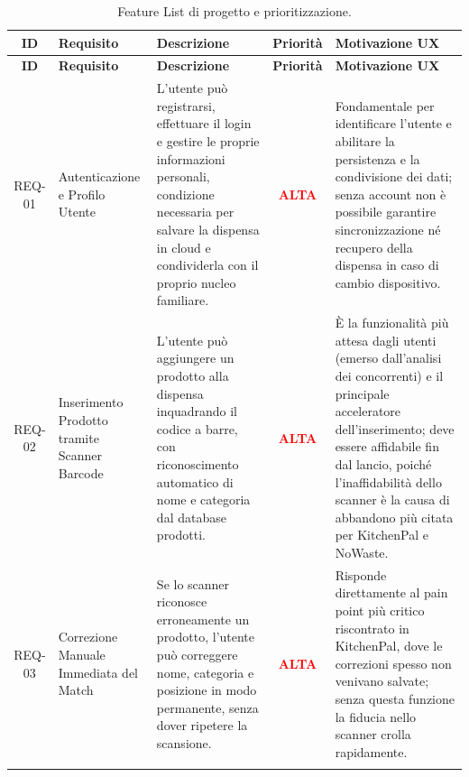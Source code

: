 \documentclass[11pt,a4paper]{article}
\begin{document}
{\small
\renewcommand{\arraystretch}{1.3}
\begin{longtable}{
  c 
  >{\raggedright\arraybackslash}p{} 
  >{\raggedright\arraybackslash}p{} 
  c 
  >{\raggedright\arraybackslash}p{}
}
\caption{Feature List di progetto e prioritizzazione.} \label{tab:featurelist} \\
\toprule
\textbf{ID} & \textbf{Requisito} & \textbf{Descrizione} & \textbf{Priorità} & \textbf{Motivazione UX} \\ 
\midrule
\endfirsthead

\toprule
\textbf{ID} & \textbf{Requisito} & \textbf{Descrizione} & \textbf{Priorità} & \textbf{Motivazione UX} \\ 
\midrule
\endhead

\bottomrule
\endfoot

\bottomrule
\endlastfoot

REQ-01 & Autenticazione e Profilo Utente & L'utente può registrarsi, effettuare il login e gestire le proprie informazioni personali, condizione necessaria per salvare la dispensa in cloud e condividerla con il proprio nucleo familiare. & \textcolor{red}{\textbf{ALTA}} & Fondamentale per identificare l'utente e abilitare la persistenza e la condivisione dei dati; senza account non è possibile garantire sincronizzazione né recupero della dispensa in caso di cambio dispositivo. \\ \addlinespace[0.6em]

REQ-02 & Inserimento Prodotto tramite Scanner Barcode & L'utente può aggiungere un prodotto alla dispensa inquadrando il codice a barre, con riconoscimento automatico di nome e categoria dal database prodotti. & \textcolor{red}{\textbf{ALTA}} & È la funzionalità più attesa dagli utenti (emerso dall'analisi dei concorrenti) e il principale acceleratore dell'inserimento; deve essere affidabile fin dal lancio, poiché l'inaffidabilità dello scanner è la causa di abbandono più citata per KitchenPal e NoWaste. \\ \addlinespace[0.6em]

REQ-03 & Correzione Manuale Immediata del Match & Se lo scanner riconosce erroneamente un prodotto, l'utente può correggere nome, categoria e posizione in modo permanente, senza dover ripetere la scansione. & \textcolor{red}{\textbf{ALTA}} & Risponde direttamente al pain point più critico riscontrato in KitchenPal, dove le correzioni spesso non venivano salvate; senza questa funzione la fiducia nello scanner crolla rapidamente. \\ \addlinespace[0.6em]


\end{longtable}}
\end{document}
